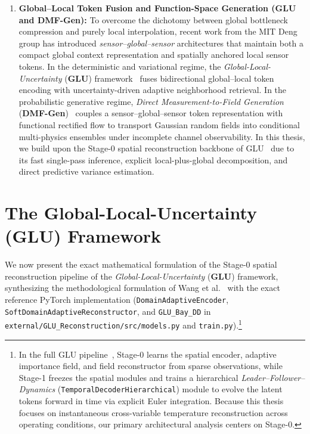 \begin{enumerate}
    \item \textbf{Global--Local Token Fusion and Function-Space Generation (GLU and DMF-Gen):} To overcome the dichotomy between global bottleneck compression and purely local interpolation, recent work from the MIT Deng group has introduced \emph{sensor--global--sensor} architectures that maintain both a compact global context representation and spatially anchored local sensor tokens. In the deterministic and variational regime, the \textit{Global-Local-Uncertainty} (\textbf{GLU}) framework~\cite{wang2026glu} fuses bidirectional global--local token encoding with uncertainty-driven adaptive neighborhood retrieval. In the probabilistic generative regime, \textit{Direct Measurement-to-Field Generation} (\textbf{DMF-Gen})~\cite{wang2026dmfgen} couples a sensor--global--sensor token representation with functional rectified flow to transport Gaussian random fields into conditional multi-physics ensembles under incomplete channel observability. In this thesis, we build upon the Stage-0 spatial reconstruction backbone of GLU~\cite{wang2026glu} due to its fast single-pass inference, explicit local-plus-global decomposition, and direct predictive variance estimation.
\end{enumerate}

\section{The Global-Local-Uncertainty (GLU) Framework}
\label{sec:bg_glu}

We now present the exact mathematical formulation of the Stage-0 spatial reconstruction pipeline of the \textit{Global-Local-Uncertainty} (\textbf{GLU}) framework, synthesizing the methodological formulation of Wang et al.~\cite{wang2026glu} with the exact reference PyTorch implementation (\texttt{DomainAdaptiveEncoder}, \texttt{SoftDomainAdaptiveReconstructor}, and \texttt{GLU\_Bay\_DD} in \texttt{external/GLU\_Reconstruction/src/models.py} and \texttt{train.py}).\footnote{In the full GLU pipeline~\cite{wang2026glu}, Stage-0 learns the spatial encoder, adaptive importance field, and field reconstructor from sparse observations, while Stage-1 freezes the spatial modules and trains a hierarchical \emph{Leader--Follower--Dynamics} (\texttt{TemporalDecoderHierarchical}) module to evolve the latent tokens forward in time via explicit Euler integration. Because this thesis focuses on instantaneous cross-variable temperature reconstruction across operating conditions, our primary architectural analysis centers on Stage-0.}

